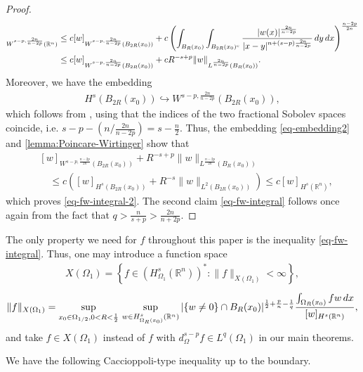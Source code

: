 \documentclass[11pt,reqno]{amsart}
\theoremstyle{plain}
\theoremstyle{definition}
\numberwithin{equation}{section}
\newcommand{\R}{\mathbb{R}}
\newcommand{\1}{\mathbbm{1}}
\renewcommand{\d}{\textnormal{\,d}}
\begin{document}
\begin{proof}
\begin{align*}
[w]_{W^{s-p, \frac{2n}{n-2p}}(\R^n)}
&\leq c[w]_{W^{s-p, \frac{2n}{n-2p}}(B_{2R}(x_0))} + c \left( \int_{B_R(x_0)} \int_{B_{2R}(x_0)^c} \frac{|w(x)|^{\frac{2n}{n-2p}}}{|x-y|^{n+(s-p)\frac{2n}{n-2p}}} \d y \d x \right)^{\frac{n-2p}{2n}} \\
&\leq c[w]_{W^{s-p, \frac{2n}{n-2p}}(B_{2R}(x_0))} + cR^{-s+p} \|w\|_{L^{\frac{2n}{n-2p}}(B_R(x_0))}.
\end{align*}
Moreover, we have the embedding
\begin{align}\label{eq-embedding2}
    H^s(B_{2R}(x_0)) \hookrightarrow W^{s-p, \frac{2n}{n-2p}}(B_{2R}(x_0)),
\end{align}
which follows from \cite[Equation~(1.301)]{Tri06}, using that the indices of the two fractional Sobolev spaces coincide, i.e. $s - p - ( n/ \frac{2n}{n-2p} ) = s - \frac{n}{2}$. Thus, the embedding \eqref{eq-embedding2} and \autoref{lemma:Poincare-Wirtinger} show that
\begin{align*}
&[w]_{W^{s-p, \frac{n-2p}{2n}}(B_{2R}(x_0))} + R^{-s+p} \|w\|_{L^{\frac{n-2p}{2n}}(B_R(x_0))} \\
&\quad \leq c \left( [w]_{H^s(B_{2R}(x_0))} + R^{-s} \|w\|_{L^2(B_{2R}(x_0))} \right) \leq c [w]_{H^s(\R^n)},
\end{align*}
which proves \eqref{eq-fw-integral-2}. The second claim \eqref{eq-fw-integral} follows once again from the fact that $q > \frac{n}{s+p} > \frac{2n}{n+2p}$.
\end{proof}


\begin{remark}
\label{remark:f-assumptions}
The only property we need for $f$ throughout this paper is the inequality \eqref{eq-fw-integral}. Thus, one may introduce a function space
\begin{align*}
X(\Omega_1)=\left\{ f \in (H_{\Omega_1}^s(\R^n))^\ast: \|f\|_{X(\Omega_1)} < \infty \right\},
\end{align*}
\begin{align*}
    \|f\|_{X(\Omega_1)} = \sup_{x_0 \in \Omega_{1/2}, 0<R<\frac{1}{2}} \, \sup_{w \in H^s_{\Omega_R(x_0)}(\R^n)} |\{ w \not = 0 \} \cap B_R(x_0)|^{\frac{1}{2} + \frac{p}{n} - \frac{1}{q}} \frac{\int_{\Omega_R(x_0)} fw \d x}{[w]_{H^s(\R^n)}},
\end{align*}
and take $f \in X(\Omega_1)$ instead of $f$ with $d_\Omega^{s-p}f \in L^q(\Omega_1)$ in our main theorems.
\end{remark}


We have the following Caccioppoli-type inequality up to the boundary.
\end{document}
